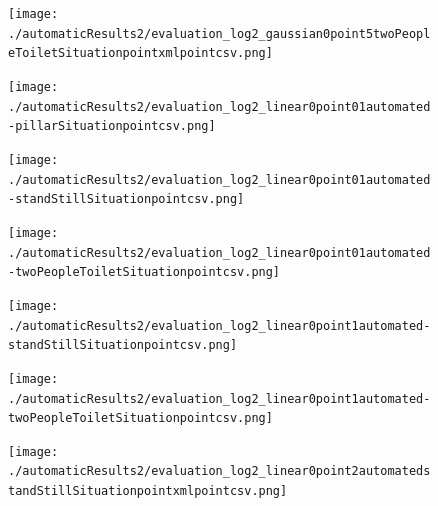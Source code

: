 \documentclass[11pt]{book}
\begin{document}
\begin{figure}
\centering
\texttt{[image: ./automaticResults2/evaluation\_log2\_gaussian0point5twoPeopleToiletSituationpointxmlpointcsv.png]}
\label{evaluation_log2_gaussian0point5twoPeopleToiletSituationpointxmlpointcsv}
\end{figure}

\begin{figure}
\centering
\texttt{[image: ./automaticResults2/evaluation\_log2\_linear0point01automated-pillarSituationpointcsv.png]}
\label{evaluation_log2_linear0point01automated-pillarSituationpointcsv}
\end{figure}
\clearpage

\begin{figure}
\centering
\texttt{[image: ./automaticResults2/evaluation\_log2\_linear0point01automated-standStillSituationpointcsv.png]}
\label{evaluation_log2_linear0point01automated-standStillSituationpointcsv}
\end{figure}

\begin{figure}
\centering
\texttt{[image: ./automaticResults2/evaluation\_log2\_linear0point01automated-twoPeopleToiletSituationpointcsv.png]}
\label{evaluation_log2_linear0point01automated-twoPeopleToiletSituationpointcsv}
\end{figure}

\begin{figure}
\centering
\texttt{[image: ./automaticResults2/evaluation\_log2\_linear0point1automated-standStillSituationpointcsv.png]}
\label{evaluation_log2_linear0point1automated-standStillSituationpointcsv}
\end{figure}

\begin{figure}
\centering
\texttt{[image: ./automaticResults2/evaluation\_log2\_linear0point1automated-twoPeopleToiletSituationpointcsv.png]}
\label{evaluation_log2_linear0point1automated-twoPeopleToiletSituationpointcsv}
\end{figure}

\begin{figure}
\centering
\texttt{[image: ./automaticResults2/evaluation\_log2\_linear0point2automatedstandStillSituationpointxmlpointcsv.png]}
\label{evaluation_log2_linear0point2automatedstandStillSituationpointxmlpointcsv}
\end{figure}
\end{document}
